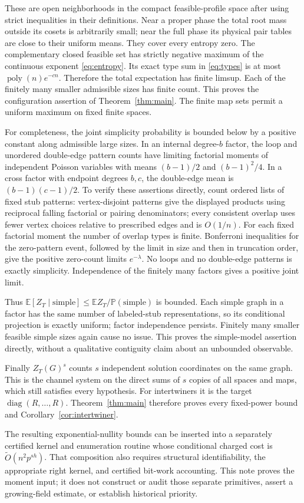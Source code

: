 \documentclass[11pt]{article}
\newcommand{\E}{\mathbb E}
\newcommand{\Prob}{\mathbb P}
\begin{document}
These are open neighborhoods in the compact feasible-profile space after using strict inequalities in their definitions. Near a proper phase the total root mass outside its cosets is arbitrarily small; near the full phase its physical pair tables are close to their uniform means. They cover every entropy zero. The complementary closed feasible set has strictly negative maximum of the continuous exponent \eqref{eq:entropy}. Its exact type sum in \eqref{eq:types} is at most $\operatorname{poly}(n)e^{-cn}$. Therefore the total expectation has finite limsup. Each of the finitely many smaller admissible sizes has finite count. This proves the configuration assertion of Theorem~\ref{thm:main}. The finite map sets permit a uniform maximum on fixed finite spaces.

For completeness, the joint simplicity probability is bounded below by a positive constant along admissible large sizes. In an internal degree-$b$ factor, the loop and unordered double-edge pattern counts have limiting factorial moments of independent Poisson variables with means $(b-1)/2$ and $(b-1)^2/4$. In a cross factor with endpoint degrees $b,c$, the double-edge mean is $(b-1)(c-1)/2$. To verify these assertions directly, count ordered lists of fixed stub patterns: vertex-disjoint patterns give the displayed products using reciprocal falling factorial or pairing denominators; every consistent overlap uses fewer vertex choices relative to prescribed edges and is $O(1/n)$. For each fixed factorial moment the number of overlap types is finite. Bonferroni inequalities for the zero-pattern event, followed by the limit in size and then in truncation order, give the positive zero-count limits $e^{-\lambda}$. No loops and no double-edge patterns is exactly simplicity. Independence of the finitely many factors gives a positive joint limit.

Thus $\E[Z_T\mid\mathrm{simple}]\le\E Z_T/\Prob(\mathrm{simple})$ is bounded. Each simple graph in a factor has the same number of labeled-stub representations, so its conditional projection is exactly uniform; factor independence persists. Finitely many smaller feasible simple sizes again cause no issue. This proves the simple-model assertion directly, without a qualitative contiguity claim about an unbounded observable.

Finally $Z_T(G)^s$ counts $s$ independent solution coordinates on the same graph. This is the channel system on the direct sums of $s$ copies of all spaces and maps, which still satisfies every hypothesis. For intertwiners it is the target $\operatorname{diag}(R,\ldots,R)$. Theorem~\ref{thm:main} therefore proves every fixed-power bound and Corollary~\ref{cor:intertwiner}.

The resulting exponential-nullity bounds can be inserted into a separately certified kernel and enumeration routine whose conditional charged cost is $\widetilde O(n^2p^{s h})$. That composition also requires structural identifiability, the appropriate right kernel, and certified bit-work accounting. This note proves the moment input; it does not construct or audit those separate primitives, assert a growing-field estimate, or establish historical priority.
\end{document}
